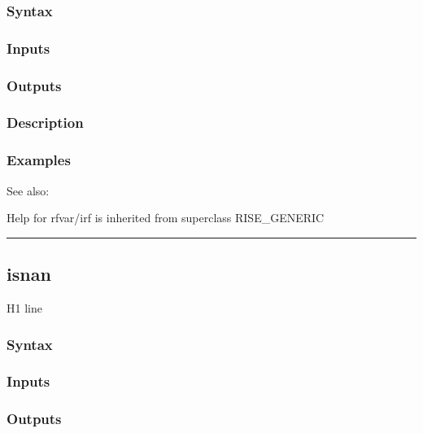 \documentclass[letterpaper,10pt,english]{sphinxmanual}
\begin{document}
\subsubsection{Syntax}
\label{classes/models/@rfvar/rfvar:id37}

\subsubsection{Inputs}
\label{classes/models/@rfvar/rfvar:id38}

\subsubsection{Outputs}
\label{classes/models/@rfvar/rfvar:id39}

\subsubsection{Description}
\label{classes/models/@rfvar/rfvar:id40}

\subsubsection{Examples}
\label{classes/models/@rfvar/rfvar:id41}
See also:

Help for rfvar/irf is inherited from superclass RISE\_GENERIC


\bigskip\hrule{}\bigskip



\subsection{isnan}
\label{classes/models/@rfvar/rfvar:isnan}\label{classes/models/@rfvar/rfvar:id42}
H1 line


\subsubsection{Syntax}
\label{classes/models/@rfvar/rfvar:id43}

\subsubsection{Inputs}
\label{classes/models/@rfvar/rfvar:id44}

\subsubsection{Outputs}
\label{classes/models/@rfvar/rfvar:id45}
\end{document}
